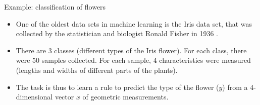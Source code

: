\documentclass[xcolor=pdftex,dvipsnames,table]{beamer}
\begin{document}
\begin{frame}{Example: classification of flowers}
\begin{figure}
  \centering
  \qquad    
  \qquad
  \qquad
  \label{fig:Iris_data_set}
\end{figure}
\begin{itemize}
	\item One of the oldest data sets in machine learning is the Iris data set, that was collected by the statistician and biologist Ronald Fisher in 1936 \cite{Fisher1936}. 
	\item There are 3 classes (different types of the Iris flower). For each class, there were 50 samples collected. For each sample, 4 characteristics were measured (lengths and widths of different parts of the plants).
	\item The task is thus to learn a rule to predict the type of the flower ($y$) from a 4-dimensional vector $x$ of geometric measurements. 
\end{itemize}
\end{frame}
\end{document}
